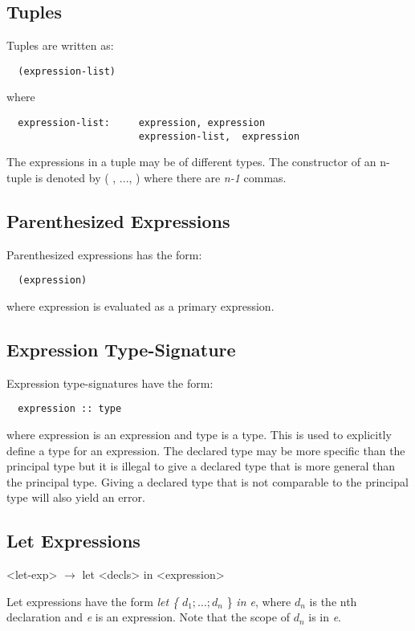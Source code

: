 \subsection{Tuples}
Tuples are written as:
  \begin{verbatim}
  (expression-list)\end{verbatim}
  where
  \begin{verbatim}
  expression-list:     expression, expression
                       expression-list,  expression \end{verbatim}
The expressions in a tuple may be of different types. The constructor of an n-tuple is denoted by (\textunderscore
, ..., \textunderscore) where there are \textit{n-1} commas.

\subsection{Parenthesized Expressions}
Parenthesized expressions has the form:
  \begin{verbatim}
  (expression)\end{verbatim}
  where expression is evaluated as a primary expression.

\subsection{Expression Type-Signature}
Expression type-signatures have the form:
  \begin{verbatim}
  expression :: type \end{verbatim}
  where expression is an expression and type is a type. This is used to explicitly define a type for an expression. The declared type may be more specific than the principal type but it is illegal to give a declared type that is more general than the principal type. Giving a declared type that is not comparable to the principal type will also yield an error.

\subsection{Let Expressions}
\begin{grammar}
<let-exp> $\rightarrow$ let <decls> in <expression>
\end{grammar}
Let expressions have the form \emph{let \{} $d_1;...;d_n$ \} \emph{in e}, where $d_n$ is the nth declaration and \emph{e} is an expression. Note that the scope of $d_n$ is in \emph{e}.



